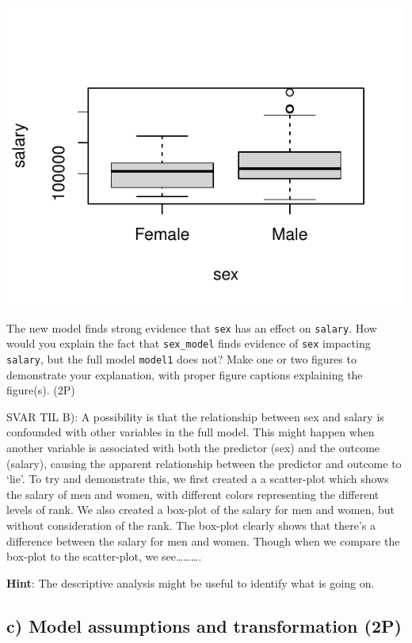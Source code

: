 \documentclass[
]{article}
\begin{document}
\begin{center}\includegraphics{compulsory_files/figure-latex/sex_model_without_rank-1} \end{center}

The new model finds strong evidence that \texttt{sex} has an effect on
\texttt{salary}. How would you explain the fact that \texttt{sex\_model}
finds evidence of \texttt{sex} impacting \texttt{salary}, but the full
model \texttt{model1} does not? Make one or two figures to demonstrate
your explanation, with proper figure captions explaining the figure(s).
(2P)

SVAR TIL B): A possibility is that the relationship between sex and
salary is confounded with other variables in the full model. This might
happen when another variable is associated with both the predictor (sex)
and the outcome (salary), causing the apparent relationship between the
predictor and outcome to `lie'. To try and demonstrate this, we first
created a a scatter-plot which shows the salary of men and women, with
different colors representing the different levels of rank. We also
created a box-plot of the salary for men and women, but without
consideration of the rank. The box-plot clearly shows that there's a
difference between the salary for men and women. Though when we compare
the box-plot to the scatter-plot, we see\ldots\ldots\ldots.

\textbf{Hint}: The descriptive analysis might be useful to identify what
is going on.

\hypertarget{c-model-assumptions-and-transformation-2p}{%
\subsection{c) Model assumptions and transformation
(2P)}\label{c-model-assumptions-and-transformation-2p}}
\end{document}
